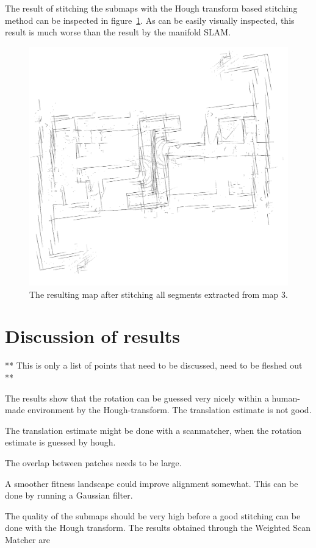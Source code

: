 The result of stitching the submaps with the Hough transform based stitching method can be inspected in figure~\ref{fig:map3-result}. As can be easily visually inspected, this result is much worse than the result by the manifold SLAM.

\begin{figure}[ht]
\centering
  \includegraphics[width=\textwidth]{images/experiment/map3/result/step2.png}
  \caption{The resulting map after stitching all segments extracted from map 3.}
  \label{fig:map3-result}
\end{figure}


\section{Discussion of results}
** This is only a list of points that need to be discussed, need to be fleshed out **

The results show that the rotation can be guessed very nicely within a human-made environment by the Hough-transform. The translation estimate is not good.

The translation estimate might be done with a scanmatcher, when the rotation estimate is guessed by hough.

The overlap between patches needs to be large.

A smoother fitness landscape could improve alignment somewhat. This can be done by running a Gaussian filter.

The quality of the submaps should be very high before a good stitching can be done with the Hough transform. The results obtained through the Weighted Scan Matcher are 